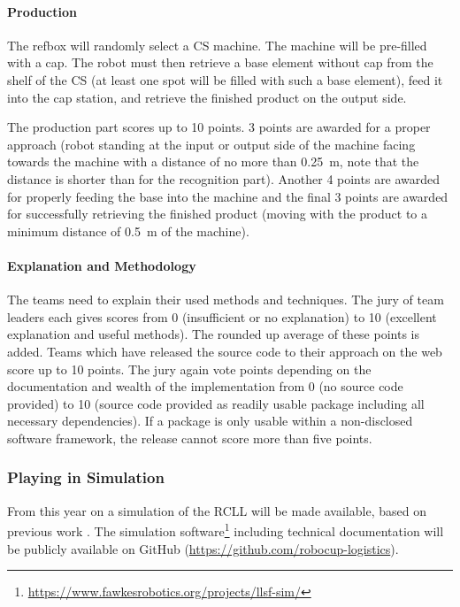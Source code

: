 \documentclass[12pt,twoside]{article}
\begin{document}
\vspace{-2ex}\paragraph{Production}
The refbox will randomly select a CS machine. The machine will be
pre-filled with a cap. The robot must then retrieve a base element
without cap from the shelf of the CS (at least one spot will be filled
with such a base element), feed it into the cap station, and retrieve
the finished product on the output side.

The production part scores up to 10 points. 3 points are awarded for a
proper approach (robot standing at the input or output side of the
machine facing towards the machine with a distance of no more than
\SI{0.25}{\metre}, note that the distance is shorter than for the
recognition part). Another 4 points are awarded for properly feeding
the base into the machine and the final 3 points are awarded for
successfully retrieving the finished product (moving with the product
to a minimum distance of \SI{0.5}{\metre} of the machine).

\vspace{-2ex}\paragraph{Explanation and Methodology}
%
The teams need to explain their used methods and techniques. The jury
of team leaders each gives scores from 0 (insufficient or no
explanation) to 10 (excellent explanation and useful methods). The
rounded up average of these points is added. Teams which have released
the source code to their approach on the web score up to 10
points. The jury again vote points depending on the documentation and
wealth of the implementation from 0 (no source code provided) to 10
(source code provided as readily usable package including all
necessary dependencies). If a package is only usable within a
non-disclosed software framework, the release cannot score more than
five points.


\subsubsection{Playing in Simulation}

From this year on a simulation of the RCLL will be made available,
based on previous work \cite{llsf-sim-rc2014-2014}. The simulation
software\footnote{\url{https://www.fawkesrobotics.org/projects/llsf-sim/}}
including technical documentation will be publicly available on GitHub
(\url{https://github.com/robocup-logistics}).
\end{document}
